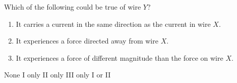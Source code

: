 \begin{questions}
\begin{oneparchoices}
\choice {}
\choice {}
\end{oneparchoices}\end{questions}

\begin{questions}\setcounter{question}{6}\question
Which of the following could be true of wire $Y$?
\begin{enumerate}
    \item It carries a current in the same direction as the current in wire $X$.
    \item It experiences a force directed away from wire $X$.
    \item It experiences a force of different magnitude than the force on wire $X$.
\end{enumerate}

\begin{oneparchoices}
\choice None
\choice I only
\choice II only
\choice III only
\choice I or II
\end{oneparchoices}\end{questions}

